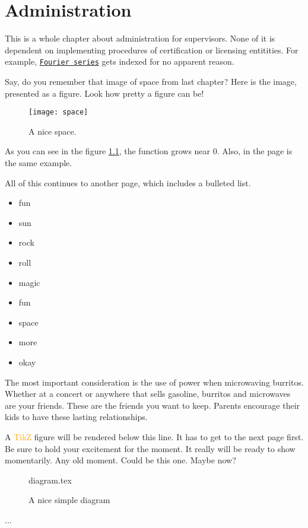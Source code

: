 \documentclass[float=false, crop=false]{standalone}
\begin{document}
\chapter{Administration}
This is a whole chapter about administration for supervisors. None of it is dependent on implementing procedures of certification or licensing entitities. For example, \underline{\texttt{\colorbox{Dandelion}{Fourier series}}}
gets indexed for no apparent reason.

Say, do you remember that image of space from last chapter? Here is the image, presented as a figure. Look how pretty a figure can be!
\begin{figure}[h]
    \centering
    \texttt{[image: space]}
    \caption{A nice space.}
    \label{fig:space1}
\end{figure}
 
As you can see in the figure \ref{fig:space1}, the 
function grows near 0. Also, in the page \pageref{fig:space1} 
is the same example.
 
All of this continues to another page, which includes a bulleted list.
\begin{itemize}
\item fun
\item sun 
\item rock
\item roll
\item magic
\item fun
\item space
\item more
\item okay
\end{itemize}


The most important consideration is the use of power when microwaving burritos. Whether at a concert or anywhere that sells gasoline, burritos and microwaves are your friends. These are the friends you want to keep. Parents encourage their kids to have these lasting relationships. 

A \textcolor{orange}{TikZ}
 figure will be rendered below this line. It has to get to the next page first. Be sure to hold your excitement for the moment. It really will be ready to show momentarily. Any old moment. Could be this one. Maybe now? 
 \begin{figure}[ht]
 {diagram.tex}
 \label{fig:tikzexample}
\caption{A nice simple diagram}
\end{figure}
 ...
\end{document}
